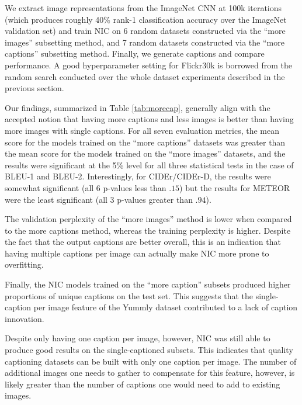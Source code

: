 \documentclass[11pt]{article}
\begin{document}
We extract image representations from the ImageNet CNN at 100k
iterations (which produces roughly 40\% rank-1 classification accuracy
over the ImageNet validation set) and train NIC on 6 random datasets
constructed via the ``more images'' subsetting method, and 7 random
datasets constructed via the ``more captions'' subsetting
method. Finally, we generate captions and compare performance.  A good
hyperparameter setting for Flickr30k is borrowed from the random
search conducted over the whole dataset experiments described in the
previous section.

Our findings, summarized in Table \ref{tab:morecap}, generally align
with the accepted notion that having more captions and less images is
better than having more images with single captions. For all seven
evaluation metrics, the mean score for the models trained on the
``more captions'' datasets was greater than the mean score for the
models trained on the ``more images'' datasets, and the results were
significant at the 5\% level for all three statistical tests in the
case of BLEU-1 and BLEU-2. Interestingly, for CIDEr/CIDEr-D, the
results were somewhat significant (all 6 p-values less than $.15$) but
the results for METEOR were the least significant (all 3 p-values
greater than $.94$).

The validation perplexity of the ``more images'' method is lower when
compared to the more captions method, whereas the training perplexity
is higher. Despite the fact that the output captions are better
overall, this is an indication that having multiple captions per image
can actually make NIC more prone to overfitting.

Finally, the NIC models trained on the ``more caption'' subsets
produced higher proportions of unique captions on the test set. This
suggests that the single-caption per image feature of the Yummly
dataset contributed to a lack of caption innovation.

Despite only having one caption per image, however, NIC was still able
to produce good results on the single-captioned subsets. This
indicates that quality captioning datasets can be built with only one
caption per image. The number of additional images one needs to gather
to compensate for this feature, however, is likely greater than the
number of captions one would need to add to existing images.
\end{document}
